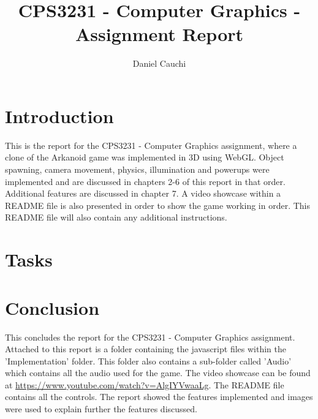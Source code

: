 \documentclass{report}
\begin{document}
\title{CPS3231  - Computer Graphics - Assignment Report}
\author{Daniel Cauchi}
\date{}
\maketitle

\tableofcontents

\chapter{Introduction}
This is the report for the CPS3231 - Computer Graphics assignment, where a clone of the Arkanoid game was implemented in 3D using WebGL. Object spawning, camera movement, physics, illumination and powerups were implemented and are discussed in chapters 2-6 of this report in that order. Additional features are discussed in chapter 7. A video showcase within a README file is also presented in order to show the game working in order. This README file will also contain any additional instructions.

\chapter{Tasks}

\pagebreak

\pagebreak

\pagebreak

\pagebreak

\pagebreak

\pagebreak

\chapter{Conclusion}
This concludes the report for the CPS3231 - Computer Graphics assignment. Attached to this report is a folder containing the javascript files within the 'Implementation' folder. This folder also contains a sub-folder called 'Audio' which contains all the audio used for the game. The video showcase can be found at \url{https://www.youtube.com/watch?v=AlgIYVwaaLg}. The README file contains all the controls. The report showed the features implemented and images were used to explain further the features discussed.

\pagebreak

\pagebreak

\end{document}
